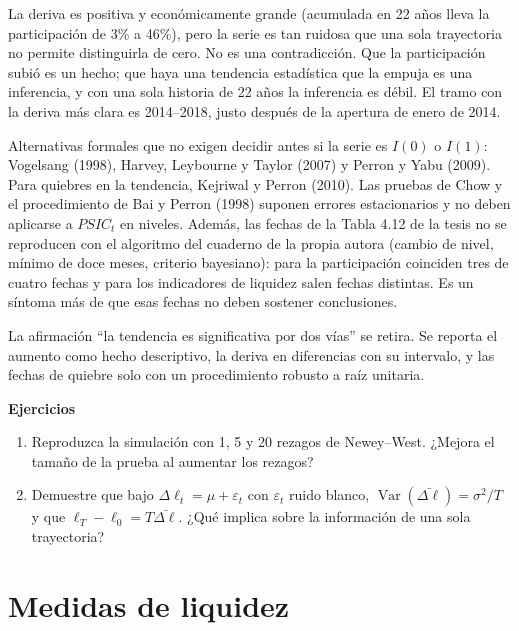 \documentclass[11pt,letterpaper]{article}
\theoremstyle{definition}
\theoremstyle{plain}
\newenvironment{ejercicios}{\par\medskip\textbf{Ejercicios}\begin{enumerate}[label=\arabic*.,leftmargin=*]\small}{\end{enumerate}}
\newcommand{\PSIC}{\mathit{PSIC}}
\begin{document}
La deriva es positiva y económicamente grande (acumulada en 22 años lleva la participación de 3\% a 46\%), pero la serie es tan ruidosa que una sola trayectoria no permite distinguirla de cero. No es una contradicción. Que la participación subió es un hecho; que haya una tendencia estadística que la empuja es una inferencia, y con una sola historia de 22 años la inferencia es débil. El tramo con la deriva más clara es 2014--2018, justo después de la apertura de enero de 2014.

Alternativas formales que no exigen decidir antes si la serie es $I(0)$ o $I(1)$: Vogelsang (1998), Harvey, Leybourne y Taylor (2007) y Perron y Yabu (2009). Para quiebres en la tendencia, Kejriwal y Perron (2010). Las pruebas de Chow y el procedimiento de Bai y Perron (1998) suponen errores estacionarios y no deben aplicarse a $\PSIC_t$ en niveles. Además, las fechas de la Tabla 4.12 de la tesis no se reproducen con el algoritmo del cuaderno de la propia autora (cambio de nivel, mínimo de doce meses, criterio bayesiano): para la participación coinciden tres de cuatro fechas y para los indicadores de liquidez salen fechas distintas. Es un síntoma más de que esas fechas no deben sostener conclusiones.

\begin{cambio}
La afirmación ``la tendencia es significativa por dos vías'' se retira. Se reporta el aumento como hecho descriptivo, la deriva en diferencias con su intervalo, y las fechas de quiebre solo con un procedimiento robusto a raíz unitaria.
\end{cambio}

\begin{ejercicios}
\item Reproduzca la simulación con 1, 5 y 20 rezagos de Newey--West. ¿Mejora el tamaño de la prueba al aumentar los rezagos?
\item Demuestre que bajo $\Delta\ell_t=\mu+\varepsilon_t$ con $\varepsilon_t$ ruido blanco, $\operatorname{Var}(\bar{\Delta\ell})=\sigma^2/T$ y que $\ell_T-\ell_0=T\bar{\Delta\ell}$. ¿Qué implica sobre la información de una sola trayectoria?
\end{ejercicios}

\section{Medidas de liquidez}
\end{document}
